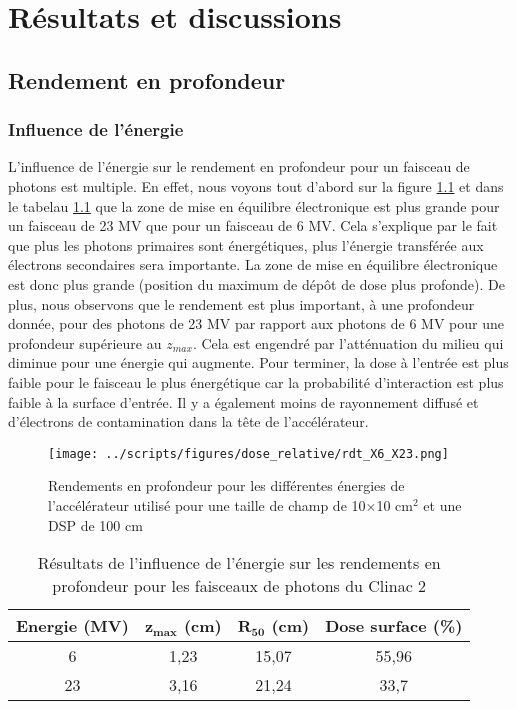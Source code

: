\documentclass{book}
\begin{document}
\newpage

\chapter{Résultats et discussions}
\section{Rendement en profondeur}
\subsection{Influence de l'énergie}
\label{partie_rdt_energie}

L'influence de l'énergie sur le rendement en profondeur pour un faisceau de photons est multiple. En effet, nous voyons tout d'abord sur la figure \ref*{fig_rdt_energie} et dans le tabelau \ref*{table_rdt_energie} que la zone de mise en équilibre électronique est plus grande pour un faisceau de 23 MV que pour un faisceau de 6 MV. Cela s'explique par le fait que plus les photons primaires sont énergétiques, plus l'énergie transférée aux électrons secondaires sera importante. La zone de mise en équilibre électronique est donc plus grande (position du maximum de dépôt de dose plus profonde). De plus, nous observons que le rendement est plus important, à une profondeur donnée, pour des photons de 23 MV par rapport aux photons de 6 MV pour une profondeur supérieure au $z_{max}$. Cela est engendré par l'atténuation du milieu qui diminue pour une énergie qui augmente. Pour terminer, la dose à l'entrée est plus faible pour le faisceau le plus énergétique car la probabilité d'interaction est plus faible à la surface d'entrée. Il y a également moins de rayonnement diffusé et d'électrons de contamination dans la tête de l'accélérateur.

\begin{figure}[h!]
  \centering
  \texttt{[image: ../scripts/figures/dose\_relative/rdt\_X6\_X23.png]}
  \caption{Rendements en profondeur pour les différentes énergies de l'accélérateur utilisé pour une taille de champ de 10$\times$10 cm$^2$ et une DSP de 100 cm}
  \label{fig_rdt_energie}
\end{figure}

\begin{table}[h]
  \centering
  \begin{tabular}{cccc}
    \toprule
    \textbf{Energie (MV)} & $\mathbf{z_{max}}$ \textbf{(cm)} & $\mathbf{R_{50}}$ \textbf{(cm)} & \textbf{Dose surface (\%)} \\
    \toprule
    6 & 1,23 & 15,07 & 55,96 \\
    23 & 3,16 & 21,24 & 33,7 \\
    \bottomrule
  \end{tabular}
  \caption{Résultats de l'influence de l'énergie sur les rendements en profondeur pour les faisceaux de photons du Clinac 2}
  \label{table_rdt_energie}
\end{table}
\end{document}

